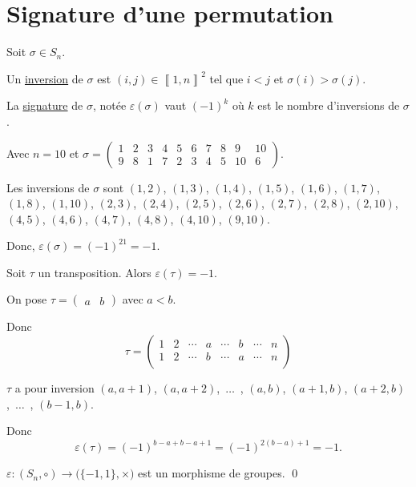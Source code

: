 \part{Signature d'une permutation}

\begin{defn}
	Soit $\sigma \in S_n$.

	Un \underline{inversion} de $\sigma$ est $(i,j) \in \left\llbracket 1,n \right\rrbracket^2$ tel que $i < j$ et $\sigma(i) >\sigma(j)$.

	La \underline{signature} de $\sigma$, notée $\varepsilon(\sigma)$ vaut $(-1)^k$ où $k$ est le nombre d'inversions de $\sigma$.
\end{defn}

\begin{exm}
	Avec $n = 10$ et $\sigma = \begin{pmatrix}
		1&2&3&4&5&6&7&8&9&10\\
		9&8&1&7&2&3&4&5&10&6
	\end{pmatrix}$.

	Les inversions de $\sigma$ sont $(1,2)$, $(1,3)$, $(1,4)$, $(1,5)$, $(1,6)$, $(1,7)$, $(1,8)$, $(1,10)$, $(2,3)$, $(2,4)$, $(2,5)$, $(2,6)$, $(2,7)$, $(2,8)$, $(2, 10)$, $(4,5)$, $(4,6)$, $(4,7)$, $(4,8)$, $(4,10)$, $(9,10)$.

	Donc, $\varepsilon(\sigma) = (-1)^{21} = -1$.
\end{exm}

\begin{prop}
	Soit $\tau$ un transposition. Alors $\varepsilon(\tau) = -1$.
\end{prop}

\begin{prv}
	On pose $\tau = \begin{pmatrix}
		a&b
	\end{pmatrix}$ avec $a < b$.

	Donc \[
		\tau = \begin{pmatrix}
			1&2&\cdots&a&\cdots&b&\cdots&n\\
			1&2&\cdots&b&\cdots&a&\cdots&n\\
		\end{pmatrix}
	\]

	$\tau$ a pour inversion $(a,a+1)$, $(a, a+2)$,~$\ldots$~, $(a,b)$, $(a+1,b)$, $(a+2,b)$,~$\ldots$~, $(b-1,b)$.

	Donc \[
		\varepsilon(\tau) = (-1)^{b-a+b-a+1} = (-1)^{2(b-a) + 1} = -1.
	\] 
\end{prv}

\begin{thm}
	$\varepsilon: (S_n, \circ) \to \big(\{-1,1\}, \times\big)$ est un morphisme de groupes.
	\qed
\end{thm}

